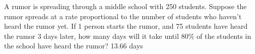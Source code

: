 {
A rumor is spreading through a middle school with 250 students.  Suppose the rumor spreads at a rate proportional to the number of students who haven't heard the rumor yet.  If 1 person starts the rumor, and 75 students have heard the rumor 3 days later, how many days will it take until 80\% of the students in the school have heard the rumor?
}
{
13.66 days
}
